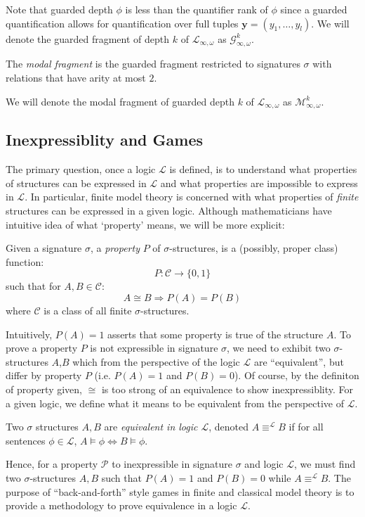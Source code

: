 Note that guarded depth $\phi$ is less than the quantifier rank of $\phi$ since a guarded quantification allows for quantification over full tuples $\mathbf{y} = (y_{1},\dots,y_{l})$. We will denote the guarded fragment of depth $k$ of $\mathcal{L}_{\infty,\omega}$ as $\mathcal{G}^{k}_{\infty,\omega}$.
\begin{defn}
The \textit{modal fragment} is the guarded fragment restricted to signatures $\sigma$ with relations that have arity at most $2$. 
\end{defn}
We will denote the modal fragment of guarded depth $k$ of $\mathcal{L}_{\infty,\omega}$ as $\mathcal{M}^{k}_{\infty,\omega}$.
\subsection{Inexpressiblity and Games}
The primary question, once a logic $\mathcal{L}$ is defined, is to understand what properties of structures can be expressed in $\mathcal{L}$ and what properties are impossible to express in $\mathcal{L}$. In particular, finite model theory is concerned with what properties of \textit{finite} structures can be expressed in a given logic. Although mathematicians have intuitive idea of what `property' means, we will be more explicit:
\begin{defn}
Given a signature $\sigma$, a \textit{property} $P$ of $\sigma$-structures, is a (possibly, proper class) function:
$$P:\mathcal{C} \longrightarrow \{0,1\}$$
such that for $A,B \in \mathcal{C}$:
$$A \cong B \Rightarrow P(A) = P(B)$$ 
where $\mathcal{C}$ is a class of all finite $\sigma$-structures.
\end{defn}
Intuitively, $P(A) = 1$ asserts that some property is true of the structure $A$. To prove a property $P$ is not expressible in signature $\sigma$, we need to exhibit two $\sigma$-structures $A$,$B$ which from the perspective of the logic $\mathcal{L}$ are ``equivalent'', but differ by property $P$ (i.e. $P(A) = 1$ and $P(B) = 0$). Of course, by the definiton of property given, $\cong$ is too strong of an equivalence to show inexpressiblity. For a given logic, we define what it means to be equivalent from the perspective of $\mathcal{L}$.  
\begin{defn}
Two $\sigma$ structures $A,B$ are \textit{equivalent in logic $\mathcal{L}$}, denoted $A \equiv^{\mathcal{L}} B$ if for all sentences $\phi \in \mathcal{L}$, $A \vDash \phi \Leftrightarrow B \vDash \phi$.  
\end{defn}
Hence, for a property $\mathcal{P}$ to inexpressible in signature $\sigma$ and logic $\mathcal{L}$, we must find two $\sigma$-structures $A,B$ such that $P(A) = 1$ and $P(B) = 0$ while $A \equiv^{\mathcal{L}} B$. The purpose of ``back-and-forth'' style games in finite and classical model theory is to provide a methodology to prove equivalence in a logic $\mathcal{L}$.  

